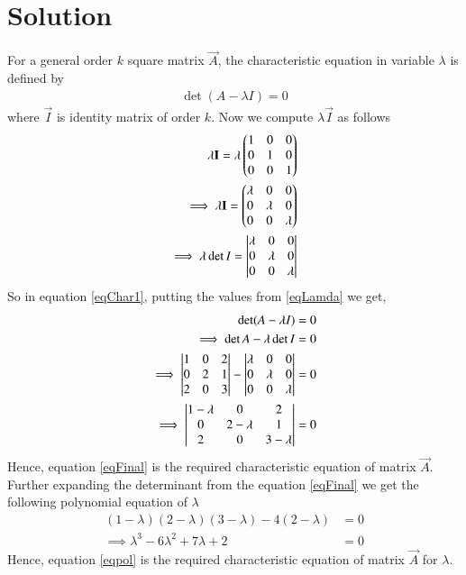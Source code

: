 \documentclass[journal,12pt,twocolumn]{IEEEtran}
\begin{document}
\section{Solution}
For a general order $k$ square matrix $\vec{A}$, the characteristic equation in variable $\lambda$ is defined by
\begin{align}
\det({A-\lambda I}) = 0\label{eqChar1}
\end{align}
where $\vec{I}$ is identity matrix of order $k$. Now we compute $\lambda \vec{I}$ as follows
\begin{align}
\lambda \mathbf{I} = \lambda \begin{pmatrix}1&0&0\\0&1&0\\0&0&1\end{pmatrix}\\
\implies\lambda \mathbf{I} = \begin{pmatrix}\lambda &0&0\\0&\lambda &0\\0&0&\lambda\end{pmatrix}\\
\implies\lambda\det{I} = \begin{vmatrix}\lambda &0&0\\0&\lambda &0\\0&0&\lambda\end{vmatrix}\label{eqLamda}
\end{align}
So in equation \ref{eqChar1}, putting the values from \ref{eqLamda} we get,
\begin{align}
\det({A-\lambda I}) &= 0\\
\implies\det{A}-\lambda \det{I} &= 0\\
\implies\begin{vmatrix}1&0&2\\0&2&1\\2&0&3\end{vmatrix}-\begin{vmatrix}\lambda &0&0\\0&\lambda &0\\0&0&\lambda \end{vmatrix} &= 0\\
\implies\begin{vmatrix}1-\lambda &0&2\\0&2-\lambda &1\\2&0& 3-\lambda\end{vmatrix} &= 0\label{eqFinal}
\end{align}
Hence, equation \ref{eqFinal} is the required characteristic equation of matrix $\vec{A}$. Further expanding the determinant from the equation \ref{eqFinal} we get the following polynomial equation of $\lambda$ 
\begin{align}
(1-\lambda )(2-\lambda)(3-\lambda)-4(2-\lambda) &= 0\\
\implies\lambda^3-6\lambda^2+7\lambda+2 &=0\label{eqpol}
\end{align}
Hence, equation \ref{eqpol} is the required characteristic equation of matrix $\vec{A}$ for $\lambda$.
\end{document}
